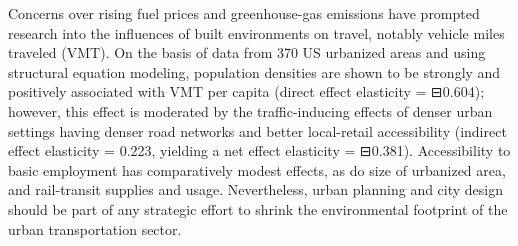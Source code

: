  Concerns over rising fuel prices and greenhouse-gas emissions have prompted research into the influences of built environments on travel, notably vehicle miles traveled (VMT). On the basis of data from 370 US urbanized areas and using structural equation modeling, population densities are shown to be strongly and positively associated with VMT per capita (direct effect elasticity = ⊟0.604); however, this effect is moderated by the traffic-inducing effects of denser urban settings having denser road networks and better local-retail accessibility (indirect effect elasticity = 0.223, yielding a net effect elasticity = ⊟0.381). Accessibility to basic employment has comparatively modest effects, as do size of urbanized area, and rail-transit supplies and usage. Nevertheless, urban planning and city design should be part of any strategic effort to shrink the environmental footprint of the urban transportation sector. 